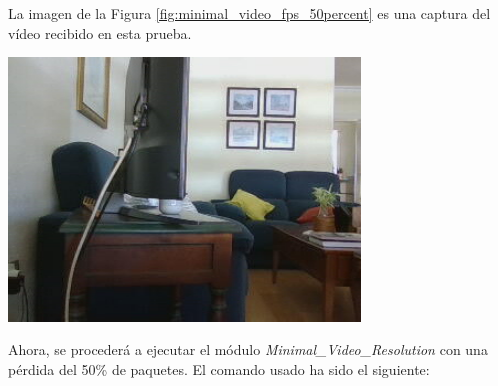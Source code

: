 \newpage
La imagen de la Figura \ref{fig:minimal_video_fps_50percent} es una captura del vídeo recibido en esta prueba.
\begin{center}
  \includegraphics[width = 0.7\textwidth]{images/VideoRecibido9.2.png}
  \label{fig:minimal_video_fps_50percent}
\end{center}

\newpage


Ahora, se procederá a ejecutar el módulo \textit{Minimal\_Video\_Resolution} con una pérdida del 50\% de paquetes. El comando usado ha sido el siguiente:

